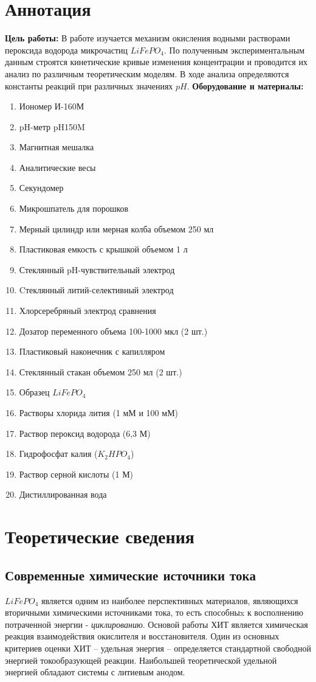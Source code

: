 \documentclass[a4paper,12pt]{article} %
\begin{document}
\section{Аннотация}
\textbf{Цель работы:} В работе изучается механизм окисления водными растворами пероксида водорода микрочастиц $LiFePO_4$. По полученным экспериментальным данным строятся кинетические кривые изменения концентрации и проводится их анализ по различным теоретическим моделям. В ходе анализа определяются константы реакций при различных значениях $pH$.
\newline \textbf{Оборудование и материалы:}
\begin{enumerate}
    \item Иономер И-160М
    \item pH-метр pH150M
    \item Магнитная мешалка
    \item Аналитические весы
    \item Секундомер
    \item Микрошпатель для порошков
    \item Мерный цилиндр или мерная колба объемом 250 мл
    \item Пластиковая емкость с крышкой объемом 1 л
    \item Стеклянный pH-чувствительный электрод
    \item Cтеклянный литий-селективный электрод
    \item Хлорсеребряный электрод сравнения
    \item Дозатор переменного объема 100-1000 мкл (2 шт.)
    \item Пластиковый наконечник с капилляром
    \item Стеклянный стакан объемом 250 мл (2 шт.)
    \item Образец $LiFePO_4$
    \item Растворы хлорида лития (1 мМ и 100 мМ)
    \item Раствор пероксид водорода (6,3 М)
    \item Гидрофосфат калия ($K_2HPO_4$)
    \item Раствор серной кислоты (1 М)
    \item Дистиллированная вода
\end{enumerate}


\section{Теоретические сведения}
\subsection{Современные химические источники тока}\par
$LiFePO_4$ является одним из наиболее перспективных материалов, являющихся вторичными химическими источниками тока, то есть способныx к восполнению потраченной энергии - \textit{циклированию}. Основой работы ХИТ является химическая реакция взаимодействия окислителя и восстановителя. Один из основных критериев оценки ХИТ – удельная энергия – определяется стандартной свободной энергией токообразующей реакции. Наибольшей теоретической удельной энергией обладают системы с литиевым анодом. \par 
\end{document}
